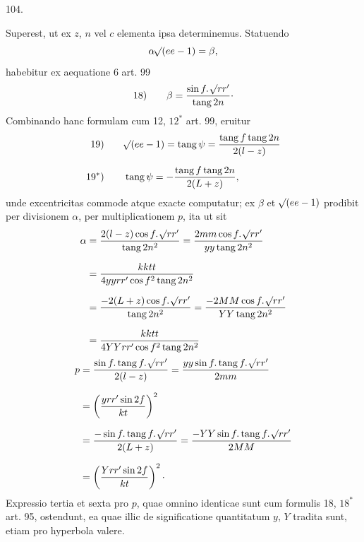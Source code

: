 \par{}\medskip
\hypertarget{native-143-article104}{}
\begin{center}104.\end{center}
Superest, ut ex $z$, $n$ vel $c$ elementa ipsa determinemus. Statuendo
\[
\alpha\mathord{{}^{}\!\surd}(ee-1)=\beta,
\]
\noindent habebitur ex aequatione 6 art. 99
\[
\mathrm{18)}\qquad\beta=\frac{\sin f\mathpunct{.}\mathord{{}^{}\!\surd}rr'}{\operatorname{tang}2n}\mathpunct{\cdot}
\]
\noindent Combinando hanc formulam cum 12, $12^*$ art. 99, eruitur
\[
\begin{aligned}
\mathrm{19)}\qquad&\mathord{{}^{}\!\surd}(ee-1)=\operatorname{tang}\psi=\frac{\operatorname{tang}f\operatorname{tang}2n}{2(l-z)}\\[.6em]
\mathrm{19^*)}\qquad&\operatorname{tang}\psi=-\frac{\operatorname{tang}f\operatorname{tang}2n}{2(L+z)},
\end{aligned}
\]
\noindent unde excentricitas commode atque exacte computatur; ex $\beta$ et $\mathord{{}^{}\!\surd}(ee-1)$ prodibit per divisionem $\alpha$, per multiplicationem $p$, ita ut sit
\[
\begin{aligned}
\alpha&=\frac{2(l-z)\cos f\mathpunct{.}\mathord{{}^{}\!\surd}rr'}{\operatorname{tang}2n^2}
=\frac{2mm\cos f\mathpunct{.}\mathord{{}^{}\!\surd}rr'}{yy\operatorname{tang}2n^2}\\[.7em]
&=\frac{kktt}{4yyrr'\cos f^2\operatorname{tang}2n^2}\\[.7em]
&=\frac{-2(L+z)\cos f\mathpunct{.}\mathord{{}^{}\!\surd}rr'}{\operatorname{tang}2n^2}
=\frac{-2MM\cos f\mathpunct{.}\mathord{{}^{}\!\surd}rr'}{YY\operatorname{tang}2n^2}\\[.7em]
&=\frac{kktt}{4YYrr'\cos f^2\operatorname{tang}2n^2}
\end{aligned}
\]
\[
\begin{aligned}
p&=\frac{\sin f\mathpunct{.}\operatorname{tang}f\mathpunct{.}\mathord{{}^{}\!\surd}rr'}{2(l-z)}
=\frac{yy\sin f\mathpunct{.}\operatorname{tang}f\mathpunct{.}\mathord{{}^{}\!\surd}rr'}{2mm}\\[.7em]
&=\left(\frac{yrr'\sin2f}{kt}\right)^2\\[.7em]
&=\frac{-\sin f\mathpunct{.}\operatorname{tang}f\mathpunct{.}\mathord{{}^{}\!\surd}rr'}{2(L+z)}
=\frac{-YY\sin f\mathpunct{.}\operatorname{tang}f\mathpunct{.}\mathord{{}^{}\!\surd}rr'}{2MM}\\[.7em]
&=\left(\frac{Yrr'\sin2f}{kt}\right)^2\mathpunct{\cdot}
\end{aligned}
\]
\noindent{}Expressio tertia et sexta pro $p$, quae omnino identicae sunt cum formulis 18, $18^*$ art. 95, ostendunt, ea quae illic de significatione quantitatum $y$, $Y$ tradita sunt, etiam pro hyperbola valere.
